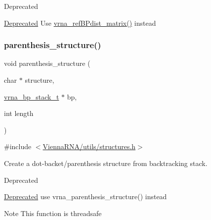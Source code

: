 \begin{DoxyRefDesc}{Deprecated}
\item[\hyperlink{deprecated__deprecated000191}{Deprecated}]Use \hyperlink{group__struct__utils_ga5a27bd058183170afd4716f5b8ff511a}{vrna\+\_\+ref\+B\+Pdist\+\_\+matrix()} instead\end{DoxyRefDesc}
\mbox{\label{group__struct__utils__deprecated_gadf0ad2d46c9ca7b850437d1b79627a7e}} 
\subsubsection{\texorpdfstring{parenthesis\+\_\+structure()}{parenthesis\_structure()}}
{\footnotesize\ttfamily void parenthesis\+\_\+structure (\begin{DoxyParamCaption}\item[{char $\ast$}]{structure,  }\item[{\hyperlink{group__data__structures_gaa651bda42e7692f08cb603cd6834b0ee}{vrna\+\_\+bp\+\_\+stack\+\_\+t} $\ast$}]{bp,  }\item[{int}]{length }\end{DoxyParamCaption})}



{\ttfamily \#include $<$\hyperlink{utils_2structures_8h}{Vienna\+R\+N\+A/utils/structures.\+h}$>$}



Create a dot-\/backet/parenthesis structure from backtracking stack. 

\begin{DoxyRefDesc}{Deprecated}
\item[\hyperlink{deprecated__deprecated000193}{Deprecated}]use vrna\+\_\+parenthesis\+\_\+structure() instead\end{DoxyRefDesc}
\begin{DoxyNote}{Note}
This function is threadsafe 
\end{DoxyNote}
\mbox{\label{group__struct__utils__deprecated_gab9c5c8311bd5120900585d4fa50c2df0}} 
